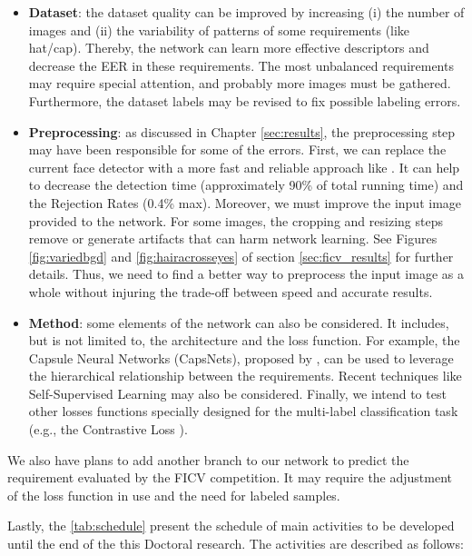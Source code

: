 \begin{itemize}
\item \textbf{Dataset}: the dataset quality can be improved by increasing (i) the number of images and (ii) the variability of patterns of some requirements (like hat/cap). Thereby, the network can learn more effective descriptors and decrease the EER in these requirements. The most unbalanced requirements may require special attention, and probably more images must be gathered. Furthermore, the dataset labels may be revised to fix possible labeling errors.

\item \textbf{Preprocessing}: as discussed in Chapter \ref{sec:results}, the preprocessing step may have been responsible for some of the errors. First, we can replace the current face detector with a more fast and reliable approach like \cite{faceboxes}. It can help to decrease the detection time (approximately 90\% of total running time) and the Rejection Rates (0.4\% max). Moreover, we must improve the input image provided to the network. For some images, the cropping and resizing steps remove or generate artifacts that can harm network learning. See Figures \ref{fig:variedbgd} and \ref{fig:hairacrosseyes} of section \ref{sec:ficv_results} for further details. Thus, we need to find a better way to preprocess the input image as a whole without injuring the trade-off between speed and accurate results.

\item \textbf{Method}: some elements of the network can also be considered. It includes, but is not limited to, the architecture and the loss function. For example, the Capsule Neural Networks (CapsNets), proposed by \cite{sabour2017dynamic}, can be used to leverage the hierarchical relationship between the requirements. Recent techniques like Self-Supervised Learning \citep{doersch2017multi} may also be considered. Finally, we intend to test other losses functions specially designed for the multi-label classification task (e.g., the Contrastive Loss \citep{khosla2020supervised}).
\end{itemize}

We also have plans to add another branch to our network to predict the \citeReq{\eyecenterlocation} requirement evaluated by the FICV competition. It may require the adjustment of the loss function in use and the need for labeled samples.



Lastly, the \autoref{tab:schedule} present the schedule of main activities to be developed until the end of the this Doctoral research. The activities are described as follows:

